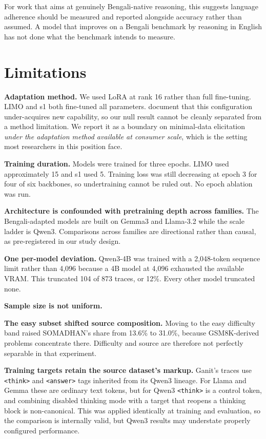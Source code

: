 For work that aims at genuinely Bengali-native reasoning, this suggests language
adherence should be measured and reported alongside accuracy rather than
assumed. A model that improves on a Bengali benchmark by reasoning in English
has not done what the benchmark intends to measure.


\section{Limitations}

\textbf{Adaptation method.} We used LoRA at rank 16 rather than full
fine-tuning. LIMO and s1 both fine-tuned all parameters.
\textcite{biderman2024lora} document that this configuration under-acquires new %
capability, so our null result cannot be cleanly separated from a method
limitation. We report it as a boundary on minimal-data elicitation \emph{under
the adaptation method available at consumer scale}, which is the setting most
researchers in this position face.

\textbf{Training duration.} Models were trained for three epochs. LIMO used
approximately 15 and s1 used 5. Training loss was still decreasing at epoch 3
for four of six backbones, so undertraining cannot be ruled out. No epoch
ablation was run.

\textbf{Architecture is confounded with pretraining depth across families.} The
Bengali-adapted models are built on Gemma3 and Llama-3.2 while the scale ladder
is Qwen3. Comparisons across families are directional rather than causal, as
pre-registered in our study design.

\textbf{One per-model deviation.} Qwen3-4B was trained with a 2,048-token
sequence limit rather than 4,096 because a 4B model at 4,096 exhausted the
available VRAM. This truncated 104 of 873 traces, or 12\%. Every other model
truncated none.

\textbf{Sample size is not uniform.} 

\textbf{The easy subset shifted source composition.} Moving to the easy
difficulty band raised SOMADHAN's share from 13.6\% to 31.0\%, because
GSM8K-derived problems concentrate there. Difficulty and source are therefore
not perfectly separable in that experiment.

\textbf{Training targets retain the source dataset's markup.} Ganit's traces use
\texttt{<think>} and \texttt{<answer>} tags inherited from its Qwen3 lineage. For
Llama and Gemma these are ordinary text tokens, but for Qwen3 \texttt{<think>}
is a control token, and combining disabled thinking mode with a target that
reopens a thinking block is non-canonical. This was applied identically at
training and evaluation, so the comparison is internally valid, but Qwen3 results
may understate properly configured performance.

